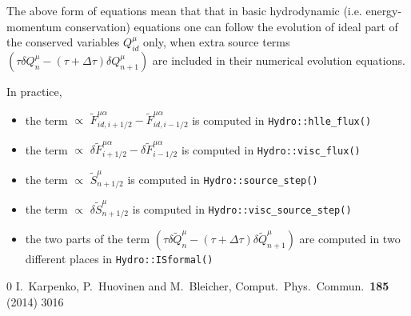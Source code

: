 \documentclass{article}
\begin{document}
The above form of equations mean that that in basic hydrodynamic (i.e. energy-momentum conservation) equations one can follow the evolution of ideal part of the conserved variables $Q_{id}^\mu$ only, when extra source terms $(\tau\delta Q^\mu_n - (\tau+\Delta\tau)\delta Q^\mu_{n+1})$ are included in their numerical evolution equations.

In practice,
\begin{itemize}
 \item the term $\propto$ $\tilde F^{\mu\alpha}_{id,i+1/2} - \tilde F^{\mu\alpha}_{id,i-1/2}$ is computed in \verb|Hydro::hlle_flux()|
 \item the term $\propto$ $\delta \tilde F^{\mu\alpha}_{i+1/2} - \delta \tilde F^{\mu\alpha}_{i-1/2}$ is computed in \verb|Hydro::visc_flux()|
 \item the term $\propto$ $\tilde S^\mu_{n+1/2}$ is computed in \verb|Hydro::source_step()|
 \item the term $\propto$ $\delta \tilde S^\mu_{n+1/2}$ is computed in \verb|Hydro::visc_source_step()|
 \item the two parts of the term $(\tau\delta \tilde Q^\mu_n - (\tau+\Delta\tau)\delta \tilde Q^\mu_{n+1})$ are computed in two different places in \verb|Hydro::ISformal()|
\end{itemize}


\begin{thebibliography}{0}
  I.~Karpenko, P.~Huovinen and M.~Bleicher,
  Comput.\ Phys.\ Commun.\  {\bf 185} (2014) 3016
\end{thebibliography}
\end{document}
